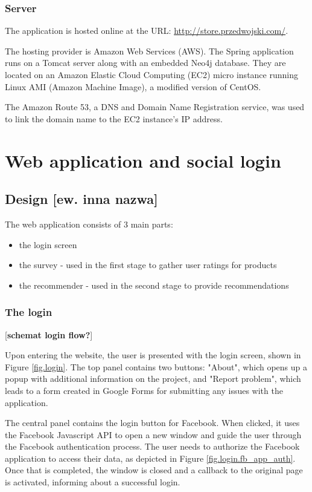 \documentclass[12pt]{report}
\begin{document}
\subsubsection{Server}

The application is hosted online at the URL: \url{http://store.przedwojski.com/}. 

The hosting provider is Amazon Web Services (AWS). The Spring application runs on a Tomcat server along with an embedded Neo4j database. They are located on an Amazon Elastic Cloud Computing (EC2) micro instance running Linux AMI (Amazon Machine Image), a modified version of CentOS.

The Amazon Route 53, a DNS and Domain Name Registration service, was used to link the domain name to the EC2 instance's IP address.

\section{Web application and social login}
\subsection{Design [ew. inna nazwa]}

The web application consists of 3 main parts:
\begin{itemize}
\item the login screen
\item the survey - used in the first stage to gather user ratings for products
\item the recommender - used in the second stage to provide recommendations
\end{itemize}

\subsubsection{The login}
[{\bf schemat login flow?}]

Upon entering the website, the user is presented with the login screen, shown in Figure \ref{fig.login}. The top panel contains two buttons: "About", which opens up a popup with additional information on the project, and "Report problem", which leads to a form created in Google Forms for submitting any issues with the application.

The central panel contains the login button for Facebook. When clicked, it uses the Facebook Javascript API to open a new window and guide the user through the Facebook authentication process. The user needs to authorize the Facebook application to access their data, as depicted in Figure \ref{fig.login.fb_app_auth}. Once that is completed, the window is closed and a callback to the original page is activated, informing about a successful login.
\end{document}
